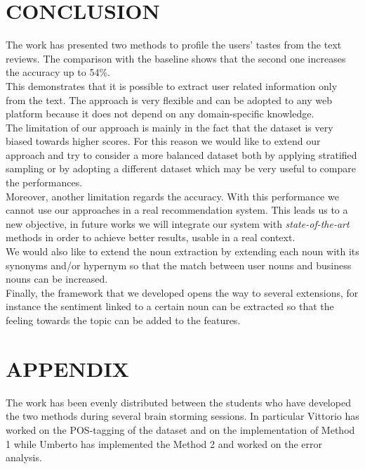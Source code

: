 \documentclass[11pt]{article}
\begin{document}
\section{CONCLUSION}
The work has presented two methods to profile the users' tastes from the text reviews. The comparison with the baseline shows that the second one increases the accuracy up to 54\%.\\
This demonstrates that it is possible to extract user related information only from the text. The approach is very flexible and can be adopted to any web platform because it does not depend on any domain-specific knowledge.\\
The limitation of our approach is mainly in the fact that the dataset is very biased towards higher scores. For this reason we would like to extend our approach and try to consider a more balanced dataset both by applying stratified sampling or by adopting a different dataset which may be very useful to compare the performances.\\
Moreover, another limitation regards the accuracy. With this performance we cannot use our approaches in a real recommendation system. This leads us to a new objective, in future works we will integrate our system with \textit{state-of-the-art} methods in order to achieve better results, usable in a real context.\\
We would also like to extend the noun extraction by extending each noun with its synonyms and/or hypernym so that the match between user nouns and business nouns can be increased.\\
Finally, the framework that we developed opens the way to several extensions, for instance the sentiment linked to a certain noun can be extracted so that the feeling towards the topic can be added to the features.\\




\addtolength{\textheight}{-12cm}   %


\newpage
\section*{APPENDIX}
The work has been evenly distributed between the students who have developed the two methods during several brain storming sessions. In particular Vittorio has worked on the POS-tagging of the dataset and on the implementation of Method 1 while Umberto has implemented the Method 2 and worked on the error analysis.
\end{document}
